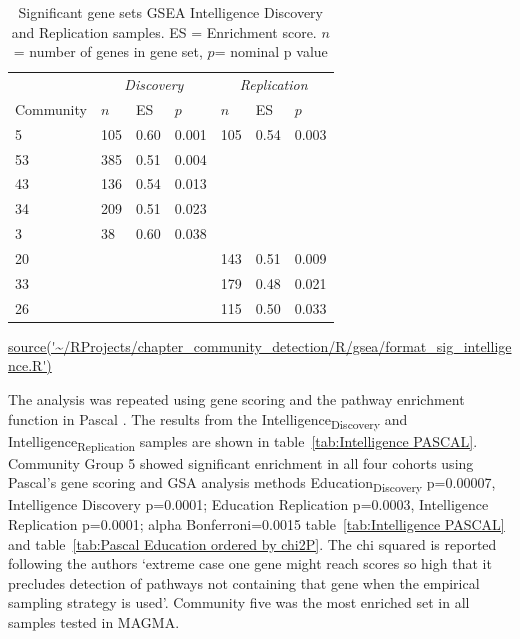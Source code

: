\begin{table}[ht!]
\centering
\setlength{\extrarowheight}{2pt}
\begin{tabular}{lllllll}
  \toprule
   &  \multicolumn{3}{c}{\textit{Discovery}} & \multicolumn{3}{c}{\textit{Replication}} \\
   \cmidrule{2-7}
Community & $n$ & ES & $p$ & $n$ & ES & $p$ \\ 
  \midrule
5 & 105 & 0.60 & 0.001 & 105 & 0.54 & 0.003 \\ 
  53 & 385 & 0.51 & 0.004 &  &  &  \\ 
  43 & 136 & 0.54 & 0.013 &  &  &  \\ 
  34 & 209 & 0.51 & 0.023 &  &  &  \\ 
  3 & 38 & 0.60 & 0.038 &  &  &  \\ 
  20 &  &  &  & 143 & 0.51 & 0.009 \\ 
  33 &  &  &  & 179 & 0.48 & 0.021 \\ 
  26 &  &  &  & 115 & 0.50 & 0.033 \\ 
   \bottomrule
\end{tabular}
\caption{Significant gene sets GSEA Intelligence Discovery and Replication samples.  ES = Enrichment score. $n$ = number of genes in gene set, $p$= nominal p value}
\tiny\url{source('~/RProjects/chapter_community_detection/R/gsea/format_sig_intelligence.R')}
\label{tab:Significant gene sets GSEA Intelligence}
\end{table}

The analysis was repeated using gene scoring and the pathway enrichment function in Pascal \cite{lamparter2016fast}. The results from the Intelligence\textsubscript{Discovery} and Intelligence\textsubscript{Replication} samples are shown in table~\ref{tab:Intelligence PASCAL}. Community Group 5 showed significant enrichment in all four cohorts using Pascal’s gene scoring and GSA analysis methods Education\textsubscript{Discovery} p=0.00007, Intelligence Discovery p=0.0001; Education Replication p=0.0003, Intelligence Replication p=0.0001; alpha Bonferroni=0.0015 table~\ref{tab:Intelligence PASCAL} and table~\ref{tab:Pascal Education ordered by chi2P}. The chi squared is reported following the authors `extreme case one gene might reach scores so high that it precludes detection of pathways not containing that gene when the empirical sampling strategy is used'\cite{lamparter2016fast}. Community five was the most enriched set in all samples tested in MAGMA. 


